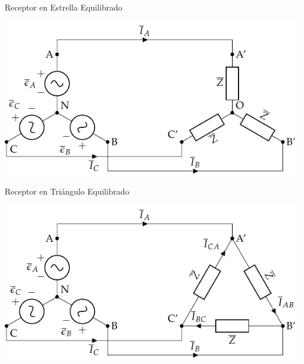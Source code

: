\documentclass[aspectratio=169, usenames,svgnames,dvipsnames]{beamer}
\begin{document}
\begin{frame}[label={sec:org9e952bd}]{Receptor en Estrella Equilibrado}
\begin{center}
\includegraphics[width=.9\linewidth]{../figs/EstrellaEquilibrado_SinNeutro.pdf}
\end{center}
\end{frame}

\begin{frame}[label={sec:org113d8d1}]{Receptor en Triángulo Equilibrado}
\begin{center}
\includegraphics[width=.9\linewidth]{../figs/TrianguloEquilibrado.pdf}
\end{center}
\end{frame}
\end{document}
